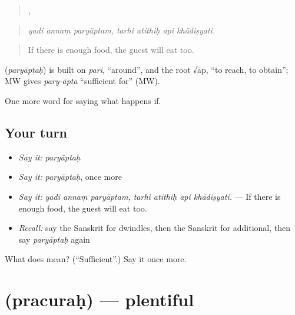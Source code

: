 \begin{quote}
  ,    
\end{quote}

\begin{quote}
\emph{yadi annaṃ paryāptam, tarhi atithiḥ api khādiṣyati.}
\end{quote}

\begin{quote}
If there is enough food, the guest will eat too.
\end{quote}

\begin{cousinweb}
\textbf{} (\emph{paryāptaḥ}) is built on \emph{pari}, \textquotedblleft{}around\textquotedblright{}, and the root √āp, \textquotedblleft{}to reach, to obtain\textquotedblright{}; MW gives \emph{pary-āpta} \textquotedblleft{}sufficient for\textquotedblright{} (MW).
\end{cousinweb}

\begin{grammarlens}[title={What you've built}]
One more word for saying what happens if.
\end{grammarlens}

\subsection*{Your turn}
\begin{itemize}
\raggedright
  \item \emph{Say it:} \emph{paryāptaḥ}
  \item \emph{Say it:} \emph{paryāptaḥ}, once more
  \item \emph{Say it:} \emph{yadi annaṃ paryāptam, tarhi atithiḥ api khādiṣyati.} — If there is enough food, the guest will eat too.
  \item \emph{Recall:} say the Sanskrit for dwindles, then the Sanskrit for additional, then say \emph{paryāptaḥ} again
\end{itemize}

\begin{tcolorbox}[breakable,colback=teal!4,colframe=teal!35!black,title={Before you move on}]
What does  mean? (\textquotedblleft{}Sufficient\textquotedblright{}.) Say it once more.
\end{tcolorbox}
\section[\texorpdfstring{\sk{प्रचुरः} (pracuraḥ)}{प्रचुरः (pracuraḥ)}]{ (pracuraḥ) — plentiful}

